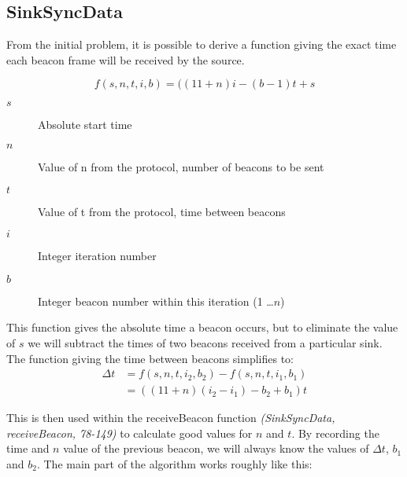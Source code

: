 \documentclass[a4paper,12pt,draft,DIV=calc]{scrartcl}
\newcommand{\coderef}[3]{\emph{(#1, #2, #3)}}
\begin{document}
\subsection{SinkSyncData}


From the initial problem, it is possible to derive a function giving the exact
time each beacon frame will be received by the source.

\begin{equation*}
  f(s, n, t, i, b) = ((11 + n)i - (b - 1)t + s
\end{equation*}
\begin{description}
  \item[$s$] Absolute start time
  \item[$n$] Value of n from the protocol, number of beacons to be sent
  \item[$t$] Value of t from the protocol, time between beacons
  \item[$i$] Integer iteration number
  \item[$b$] Integer beacon number within this iteration (1 \dots $n$)
\end{description}

This function gives the absolute time a beacon occurs, but to eliminate the
value of $s$ we will subtract the times of two beacons received from a
particular sink. The function giving the time between beacons simplifies to:
\begin{align*}
  \Delta t &= f(s, n, t, i_2, b_2) - f(s, n, t, i_1, b_1) \\
           &= ((11 + n)(i_2 - i_1) - b_2 + b_1)t
\end{align*}

This is then used within the receiveBeacon function \coderef{SinkSyncData}
{receiveBeacon}{78-149} to calculate good values for $n$ and $t$. By recording
the time and $n$ value of the previous beacon, we will always know the values
of $\Delta t$, $b_1$ and $b_2$. The main part of the algorithm works roughly
like this:
\end{document}
